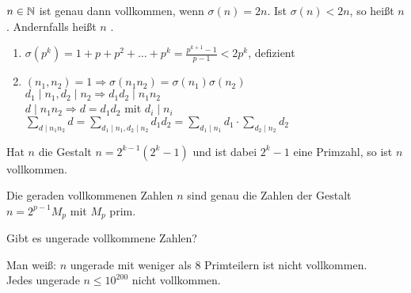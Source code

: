 $n \in \mathbb{N}$ ist genau dann vollkommen, wenn $\sigma(n) = 2n$. Ist $\sigma(n) < 2n$, so heißt $n$ . Andernfalls heißt $n$ .
\begin{enumerate}[(1)]
	\item $\sigma(p^k) = 1 + p + p^2 + \dots + p^k = \frac{p^{k+1}-1}{p-1} < 2p^k$, defizient
	\item $(n_1,n_2) = 1 \Rightarrow \sigma(n_1n_2) = \sigma(n_1) \sigma(n_2)$ \\
	$d_1 \mid n_1, d_2 \mid n_2 \Rightarrow d_1 d_2 \mid n_1 n_2$ \\
	$d \mid n_1 n_2 \Rightarrow d=d_1d_2$ mit $d_i \mid n_i$
	$\sum\limits_{d \mid n_1n_2} d = \sum\limits_{d_1 \mid n_1, d_2 \mid n_2} d_1d_2 = \sum\limits_{d_1 \mid n_1} d_1 \cdot \sum\limits_{d_2 \mid n_2} d_2$
\end{enumerate}

\setcounter{falko}{5}
\begin{falko}	\label{F7.6}
	Hat $n$ die Gestalt $n = 2^{k-1} (2^k-1)$ und ist dabei $2^k - 1$ eine Primzahl, so ist $n$ vollkommen.
\end{falko}

\begin{falko}	\label{F7.7}
	Die geraden vollkommenen Zahlen $n$ sind genau die Zahlen der Gestalt $n = 2^{p-1} M_p$ mit $M_p$ prim.
\end{falko}

	Gibt es ungerade vollkommene Zahlen?
	
	Man weiß: $n$ ungerade mit weniger als 8 Primteilern ist nicht vollkommen. \\
	Jedes ungerade $n \leq 10^{200}$ nicht vollkommen.
\cleardoubleemptypage